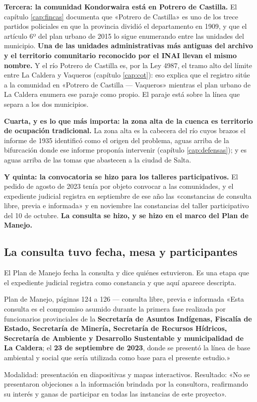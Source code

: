 \textbf{Tercera: la comunidad Kondorwaira está en Potrero de Castilla.} El capítulo \ref{cap:fincas} documenta
que «Potrero de Castilla» es uno de los trece partidos policiales en que la provincia dividió
el departamento en 1909, y que el artículo 6º del plan urbano de 2015 lo sigue enumerando
entre las unidades del municipio. \textbf{Una de las unidades administrativas más antiguas del archivo y el territorio comunitario reconocido por el INAI llevan el mismo nombre.} Y el río Potrero de Castilla es, por la Ley 4987, el tramo alto del límite entre La Caldera y Vaqueros (capítulo \ref{cap:cot}): eso explica que el registro sitúe a la comunidad en «Potrero de Castilla --- Vaqueros» mientras el plan urbano de La Caldera enumera ese paraje como propio. El paraje está sobre la línea que separa a los dos municipios.

\textbf{Cuarta, y es lo que más importa: la zona alta de la cuenca es territorio de ocupación
tradicional.} La zona alta es la cabecera del río cuyos brazos el informe de 1935
identificó como el origen del problema, aguas arriba de la bifurcación donde ese informe proponía intervenir (capítulo \ref{cap:defensas}); y
es aguas arriba de las tomas que abastecen a la ciudad de Salta.

\textbf{Y quinta: la convocatoria se hizo para los talleres participativos.} El pedido de
agosto de 2023 tenía por objeto convocar a las comunidades, y el expediente judicial registra
en septiembre de ese año las «constancias de consulta libre, previa e informada» y en
noviembre las constancias del taller participativo del 10 de octubre. \textbf{La consulta se hizo, y se hizo en el marco del Plan
de Manejo.}

\subsection*{La consulta tuvo fecha, mesa y participantes}

El Plan de Manejo fecha la consulta y dice quiénes estuvieron. Es una etapa que el
expediente judicial registra como constancia y que aquí aparece descripta.

\begin{ficha}{Plan de Manejo, páginas 124 a 126 --- consulta libre, previa e informada}
«Esta consulta es el compromiso asumido durante la primera fase realizada por funcionarios
provinciales de la \textbf{Secretaría de Asuntos Indígenas, Fiscalía de Estado, Secretaría de
Minería, Secretaría de Recursos Hídricos, Secretaría de Ambiente y Desarrollo Sustentable y
municipalidad de La Caldera}; el \textbf{23 de septiembre de 2023}, donde se presentó la
línea de base ambiental y social que sería utilizada como base para el presente estudio.»

Modalidad: presentación en diapositivas y mapas interactivos. Resultado: «No se presentaron
objeciones a la información brindada por la consultora, reafirmando su interés y ganas de
participar en todas las instancias de este proyecto».
\end{ficha}

